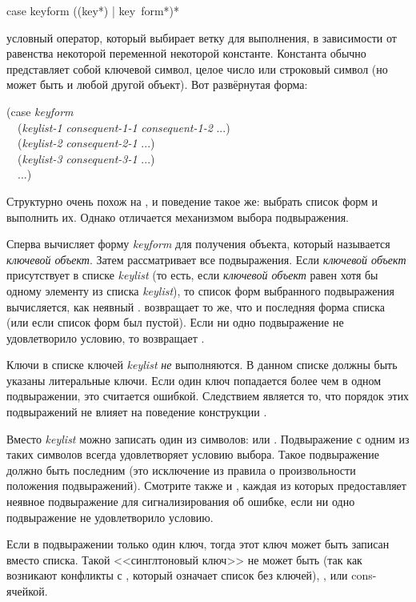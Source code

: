\begin{defmac}
case keyform {({({key}*) | key} {\,form}*)}*

 условный оператор, который выбирает ветку для выполнения, в
зависимости от равенства некоторой переменной некоторой константе. Константа
обычно представляет собой ключевой символ, целое число или строковый символ (но
может быть и любой другой объект). Вот развёрнутая форма:
\begin{lisp}
(case \emph{keyform} \\
~~(\emph{keylist-1} \emph{consequent-1-1} \emph{consequent-1-2} ...) \\
~~(\emph{keylist-2} \emph{consequent-2-1} ...) \\
~~(\emph{keylist-3} \emph{consequent-3-1} ...) \\
~~...)
\end{lisp}
Структурно  очень похож на , и поведение такое же: выбрать
список форм и выполнить их.
Однако  отличается механизмом выбора подвыражения.

Сперва  вычисляет форму \emph{keyform} для получения объекта, который
называется \emph{ключевой объект}.
Затем  рассматривает все подвыражения. Если \emph{ключевой объект}
присутствует в списке \emph{keylist} (то есть, если \emph{ключевой объект} равен
 хотя бы одному элементу из списка \emph{keylist}), то список форм
выбранного подвыражения вычисляется, как неявный .
 возвращает то же, что и последняя форма списка (или {\false} если
список форм был пустой).
Если ни одно подвыражение не удовлетворило условию, то  возвращает
{\false}.

Ключи в списке ключей \emph{keylist} \emph{не} выполняются. В данном списке
должны быть указаны литеральные ключи.
Если один ключ попадается более чем в одном подвыражении, это считается
ошибкой.
Следствием является то, что порядок этих подвыражений не влияет на поведение
конструкции .

Вместо \emph{keylist} можно записать один из символов: {\true} или
. Подвыражение с одним из таких символов всегда удовлетворяет
условию выбора. Такое подвыражение должно быть последним (это исключение из
правила о произвольности положения подвыражений).
Смотрите также  и , каждая из которых предоставляет
неявное  подвыражение для сигнализирования об ошибке, если ни
одно подвыражение не удовлетворило условию.

Если в подвыражении только один ключ, тогда этот ключ может быть записан вместо
списка.
Такой <<синглтоновый ключ>> не может быть {\nil} (так как возникают конфликты с
{\emptylist}, который означает список без ключей), {\true},  или
cons-ячейкой.
\end{defmac}

